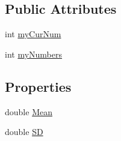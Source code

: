 \subsection*{Public Attributes}
\begin{DoxyCompactItemize}
\item 
int \hyperlink{class_p_a_z___dispersal_1_1_random_numbers_a941f8bee25446bd596c21ad54b3769b6}{my\-Cur\-Num}
\item 
int \hyperlink{class_p_a_z___dispersal_1_1_random_numbers_a2c0952f8205bf303c5f5e9d165684710}{my\-Numbers}
\end{DoxyCompactItemize}
\subsection*{Properties}
\begin{DoxyCompactItemize}
\item 
double \hyperlink{class_p_a_z___dispersal_1_1_random_numbers_a5e4a630dc1329f061744d140bf0e0646}{Mean}
\item 
double \hyperlink{class_p_a_z___dispersal_1_1_random_numbers_a842715cc77068c470aab3f2de0985764}{S\-D}
\end{DoxyCompactItemize}


